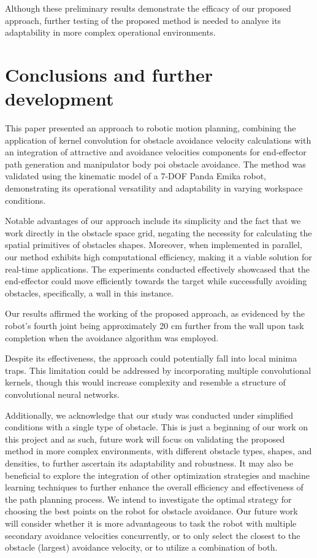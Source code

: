 \documentclass[a4paper]{article}
\begin{document}
Although these preliminary results demonstrate the efficacy of our proposed approach, further testing of the proposed method is needed to analyse  its adaptability in more complex operational environments.

\section{Conclusions and further development}

This paper presented an approach to robotic motion planning, combining the application of kernel convolution for obstacle avoidance velocity calculations with an integration of attractive and avoidance velocities components for end-effector path generation and manipulator body poi obstacle avoidance. The method was validated using the kinematic model of a 7-DOF Panda Emika robot, demonstrating its operational versatility and adaptability in varying workspace conditions.

Notable advantages of our approach include its simplicity and the fact that we work directly in the obstacle space grid, negating the necessity for calculating the spatial primitives of obstacles shapes. Moreover, when implemented in parallel, our method exhibits high computational efficiency, making it a viable solution for real-time applications. The experiments conducted effectively showcased that the end-effector could move efficiently towards the target while successfully avoiding obstacles, specifically, a wall in this instance.

Our results affirmed the working of the proposed approach, as evidenced by the robot's fourth joint being approximately 20 cm further from the wall upon task completion when the avoidance algorithm was employed.

Despite its effectiveness, the approach could potentially fall into local minima traps. This limitation could be addressed by incorporating multiple convolutional kernels, though this would increase complexity and resemble a structure of convolutional neural networks.

Additionally, we acknowledge that our study was conducted under simplified conditions with a single type of obstacle. This is just a beginning of our work on this project and as such, future work will focus on validating the proposed method in more complex environments, with different obstacle types, shapes, and densities, to further ascertain its adaptability and robustness. It may also be beneficial to explore the integration of other optimization strategies and machine learning techniques to further enhance the overall efficiency and effectiveness of the path planning process. We intend to investigate the optimal strategy for choosing the best points on the robot for obstacle avoidance. Our future work will consider whether it is more advantageous to task the robot with multiple secondary avoidance velocities concurrently, or to only select the closest to the obstacle (largest) avoidance velocity, or to utilize a combination of both.
\end{document}

